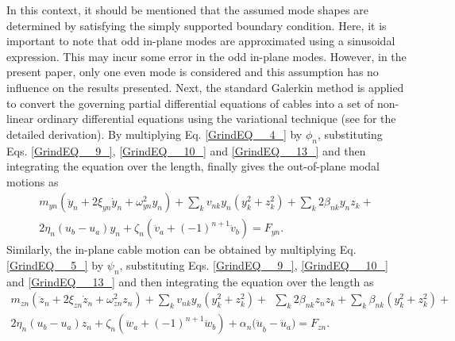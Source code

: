 \documentclass[review]{elsarticle}
\begin{document}
In this context, it should be mentioned that the assumed mode shapes are determined by satisfying the simply supported boundary condition.  Here, it is important to note that odd in-plane modes are approximated using a sinusoidal expression. This may incur some error in the odd in-plane modes. However, in the present paper, only one even mode is considered and this assumption has no influence on the results presented.
%
Next, the standard Galerkin method is applied to convert the governing partial differential equations of cables into a set of non-linear ordinary differential equations using the variational technique (see \cite{Wagg_2009,Warnitchai_1995} for the detailed derivation). By multiplying Eq. \eqref{GrindEQ__4_} by ${\phi }_n$, substituting Eqs. \eqref{GrindEQ__9_}, \eqref{GrindEQ__10_} and \eqref{GrindEQ__13_} and then integrating the equation over the length, finally gives the out-of-plane modal motions as
\begin{equation} \label{GrindEQ__15_} 
\begin{split}
m_{yn}\left({\ddot{y}}_n+2{\xi }_{yn}{\dot{y}}_n+{\omega }^2_{yn}y_n\right)+\sum_k{v_{nk}y_n\left(y^2_k+z^2_k\right)}+\sum_k{2{\beta }_{nk}y_nz_k}+\\2{\eta }_n\left(u_b-u_a\right)y_n+\zeta_n\left({\ddot{v}}_a+{\left(-1\right)}^{n+1}{\ddot{v}}_b\right)=F_{yn}.    
\end{split}
\end{equation} 
%
Similarly, the in-plane cable motion can be obtained by multiplying Eq. \eqref{GrindEQ__5_} by ${\psi }_n$, substituting Eqs. \eqref{GrindEQ__9_}, \eqref{GrindEQ__10_} and \eqref{GrindEQ__13_} and then integrating the equation over the length as
\begin{equation} \label{GrindEQ__16_} 
\begin{split}
m_{zn}\left({\ddot{z}}_n+2{\xi }_{zn}{\dot{z}}_n+{\omega }^2_{zn}z_n\right)+\sum_k{v_{nk}y_n\left(y^2_k+z^2_k\right)}+\ \ \sum_k{2{\beta }_{nk}z_nz_k}+\sum_k{{\beta }_{nk}\left(y^2_k+z^2_k\right)} +\\2{\eta }_n(u_b-u_a)z_n+{\zeta}_n\left({\ddot{w}}_a+{\left(-1\right)}^{n+1}{\ddot{w}}_b\right)+{\alpha }_n{(\ddot{u}}_b-{\ddot{u}}_a)=F_{zn}.   
\end{split}
\end{equation} 
\end{document}
